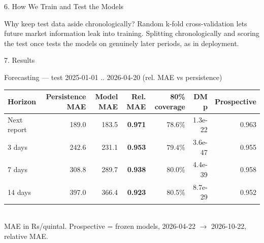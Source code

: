 \documentclass[aspectratio=169,10pt]{beamer}
\begin{document}
\begin{frame}{6. How We Train and Test the Models}
  \vspace{0.15cm}
  \begin{block}{Why keep test data aside chronologically?}
    \footnotesize
    Random k-fold cross-validation lets future market information leak into training. Splitting chronologically and scoring the test once tests the models on genuinely later periods, as in deployment.
  \end{block}
\end{frame}

\begin{frame}{7. Results}
  \begin{block}{Forecasting --- test 2025-01-01 .. 2026-04-20 (rel. MAE vs persistence)}
    \scriptsize
    \begin{tabular}{lrrrrrr}
      \textbf{Horizon} & \textbf{Persistence MAE} & \textbf{Model MAE} & \textbf{Rel. MAE} & \textbf{80\% coverage} & \textbf{DM p} & \textbf{Prospective} \\
      \midrule
      Next report & 189.0 & 183.5 & \textbf{\color{refGreen}0.971} & 78.6\% & 1.3e-22 & 0.963 \\
      3 days      & 242.6 & 231.1 & \textbf{\color{refGreen}0.953} & 79.4\% & 3.6e-47 & 0.955 \\
      7 days      & 308.8 & 289.7 & \textbf{\color{refGreen}0.938} & 80.0\% & 4.4e-39 & 0.958 \\
      14 days     & 397.0 & 366.4 & \textbf{\color{refGreen}0.923} & 80.5\% & 8.7e-29 & 0.952 \\
    \end{tabular}\\[0.2em]
    {\tiny MAE in Rs/quintal. Prospective = frozen models, 2026-04-22 $\to$ 2026-10-22, relative MAE.}
  \end{block}


\end{frame}
\end{document}
